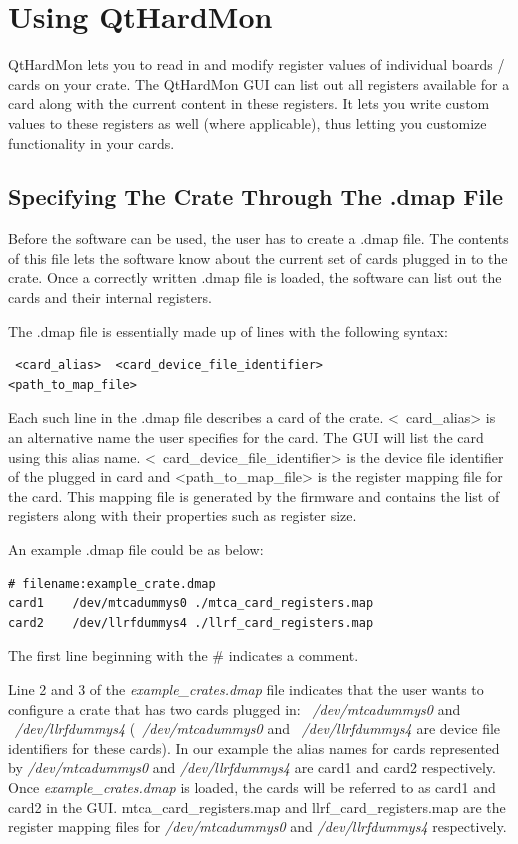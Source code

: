 \chapter{Using QtHardMon}

QtHardMon lets you to read in and modify register values of individual boards /
cards on your crate. The QtHardMon GUI can list out all registers available for
a card along with the current content in these registers. It lets you write
custom values to these registers as well (where applicable), thus letting you
customize functionality in your cards.

\section{Specifying The Crate Through The .dmap File} Before the software can be
used, the user has to create a .dmap file. The contents of this file lets the
software know about the current set of cards plugged in to the crate. Once a
correctly written .dmap file is loaded, the software can list out the cards and
their internal registers. 

The .dmap file is essentially made up of lines with the following syntax:
\begin{lstlisting} <card_alias>  <card_device_file_identifier>
<path_to_map_file> \end{lstlisting}

Each such line in the .dmap file describes a card of the crate.  \mbox{\textless
card\_alias\textgreater}  is an alternative name the user specifies for the
card. The GUI will list the card using this alias name.  \mbox{\textless
card\_device\_file\_identifier\textgreater} is the device file identifier of the
plugged in card and \mbox{\textless path\_to\_map\_file\textgreater} is the
register mapping file for the card. This mapping file is generated by the
firmware and contains the list of registers along with their properties such as
register size.
	

An example .dmap file could be as below: 

\begin{lstlisting} 
# filename:example_crate.dmap 
card1    /dev/mtcadummys0 ./mtca_card_registers.map 
card2    /dev/llrfdummys4 ./llrf_card_registers.map 
\end{lstlisting}

The first line beginning with the \# indicates a comment. 

Line 2 and 3 of the \textit{example\_crates.dmap} file indicates that the user
wants to configure a crate that has two cards plugged in:
~\textit{/dev/mtcadummys0} and ~\textit{/dev/llrfdummys4}
(~\textit{/dev/mtcadummys0} and ~\textit{/dev/llrfdummys4} are device file
identifiers for these cards).  In our example the alias names for cards
represented by \textit{/dev/mtcadummys0} and \textit{/dev/llrfdummys4} are card1
and card2 respectively. Once \textit{example\_crates.dmap} is loaded, the cards
will be referred to as card1 and card2 in the GUI.  mtca\_card\_registers.map
and llrf\_card\_registers.map are the register mapping files for
\textit{/dev/mtcadummys0} and \textit{/dev/llrfdummys4} respectively. 


